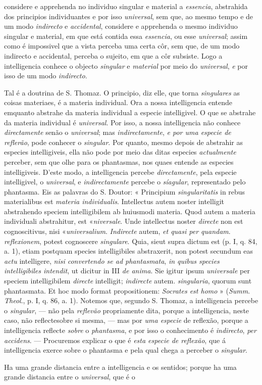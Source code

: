 considere e apprehenda no individuo singular e material a \emph{essencia}, abstrahida dos principios individuantes e por isso \emph{universal}, sem que, ao mesmo tempo e de um modo \emph{indirecto} e \emph{accidental}, considere e apprehenda o mesmo individuo singular e material, em que está contida essa \emph{essencia}, ou esse \emph{universal}; assim como é impossivel que a vista perceba uma certa côr, sem que, de um modo indirecto e accidental, perceba o sujeito, em que a côr subsiste. Logo a intelligencia conhece o objecto \emph{singular} e \emph{material} por meio do \emph{universal}, \emph{e} por isso de um modo \emph{indirecto}.\par Tal é a doutrina de S. Thomaz. O principio, diz elle, que torna \emph{singulares} as coisas materiaes, é a materia individual. Ora a nossa intelligencia entende emquanto abstrahe da materia individual a especie intelligivel. O que se abstrahe da materia individual é \emph{universal}. Por isso, a nossa intelligencia não conhece \emph{directamente} senão o \emph{universal}; mas \emph{indirectamente}, \emph{e por uma especie de reflerão}, pode conhecer o \emph{singular}. Por quanto, mesmo depois de abstrahir as especies intelligiveis, ella não pode por meio das ditas especies \emph{actualmente} perceber, sem que olhe para os phantasmas, nos quaes entende as especies intelligiveis. D'este modo, a intelligencia percebe \emph{directamente}, pela especie intelligivel, o \emph{universal}, e \emph{indirectamente} percebe o \emph{síagular}, representado pelo phantasma. Eis as palavras do S. Doutor: « Principium \emph{singularitatis} in rebus materialibus est \emph{materia individualis}. Intellectus autem noster intelligit abstrahendo speciem intelligibilem ab huiusmodi materia. Quod autem a materia individuali abstrahitur, est «\emph{niversale}. Unde intellectus noster \emph{directe} non est cognoscitivus, nisi «\emph{universalium}. \emph{Indirecte} autem, \emph{et quasi per quandam}. \emph{reflexionem}, potest cognoscere \emph{singulare}. Quia, sieut supra dictum est (p. I, q. 84, a. 1), etiam postquam species intelligibiles abstraxerit, non potest secundum eas \emph{actu} intelligere, \emph{nisi convertendo se ad phantasmata}, \emph{in quibus species intelligibiles intendit}, ut dicitur in III \emph{de anima}. Sie igitur ipsum \emph{universale} per speciem intelligibilem \emph{directe} intelligit; \emph{indirecte} autem. \emph{singularia}, quorum sunt phantasmata. Et hoc modo format propositionem: \emph{Socrates est homo} » (\emph{Summ}. \emph{Theol}., p. I, q. 86, a. 1). Notemos que, segundo S. Thomaz, a intelligencia percebe o \emph{singular}, --- não pela \emph{reflevão} propriamente dita, porque a intelligencia, neste caso, não reflectesobre si mesma, --- mas por \emph{uma especie} de reflexão, porque a intelligencia reflecte \emph{sobre} o \emph{phantasma}, e por isso o conhecimento é \emph{indirecto}, \emph{per accidens}. --- Procuremos explicar o que é \emph{esta especie de reflexão}, que á intelligencia exerce sobre o phantasma e pela qual chega a perceber o \emph{singular}.\par Ha uma grande distancia entre a intelligencia e os sentidos; porque ha uma grande distancia entre o \emph{universal}, que é o 